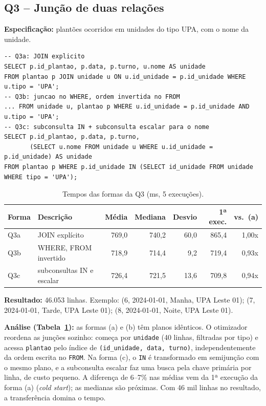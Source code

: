 \documentclass[10pt,a4paper]{article}
\begin{document}
\subsection{Q3 -- Junção de duas relações}
\textbf{Especificação:} plantões ocorridos em unidades do tipo UPA, com o nome da unidade.

\begin{lstlisting}
-- Q3a: JOIN explicito
SELECT p.id_plantao, p.data, p.turno, u.nome AS unidade
FROM plantao p JOIN unidade u ON u.id_unidade = p.id_unidade WHERE u.tipo = 'UPA';
-- Q3b: juncao no WHERE, ordem invertida no FROM
... FROM unidade u, plantao p WHERE u.id_unidade = p.id_unidade AND u.tipo = 'UPA';
-- Q3c: subconsulta IN + subconsulta escalar para o nome
SELECT p.id_plantao, p.data, p.turno,
       (SELECT u.nome FROM unidade u WHERE u.id_unidade = p.id_unidade) AS unidade
FROM plantao p WHERE p.id_unidade IN (SELECT id_unidade FROM unidade WHERE tipo = 'UPA');
\end{lstlisting}

\begin{table}[H]\centering\footnotesize
\caption{Tempos das formas da Q3 (ms, 5 execuções).}\label{tab:q3}
\begin{tabular}{llrrrrr}\toprule
Forma & Descrição & Média & Mediana & Desvio & 1ª exec. & vs.\ (a) \\ \midrule
Q3a & JOIN explícito              & 769,0 & 740,2 & 60,0 & 865,4 & 1,00x \\
Q3b & WHERE, FROM invertido       & 718,9 & 714,4 &  9,2 & 719,4 & 0,93x \\
Q3c & subconsultas IN e escalar   & 726,4 & 721,5 & 13,6 & 709,8 & 0,94x \\ \bottomrule
\end{tabular}
\end{table}

\textbf{Resultado:} 46.053 linhas. Exemplo: (6, 2024-01-01, Manha, UPA Leste 01); (7, 2024-01-01, Tarde, UPA Leste 01); (8, 2024-01-01, Noite, UPA Leste 01).

\textbf{Análise (Tabela~\ref{tab:q3}):} as formas (a) e (b) têm planos idênticos. O otimizador reordena as junções sozinho: começa por \texttt{unidade} (40 linhas, filtradas por tipo) e acessa \texttt{plantao} pelo índice de \texttt{(id\_unidade, data, turno)}, independentemente da ordem escrita no \texttt{FROM}. Na forma (c), o \texttt{IN} é transformado em semijunção com o mesmo plano, e a subconsulta escalar faz uma busca pela chave primária por linha, de custo pequeno. A diferença de 6--7\% nas médias vem da 1ª execução da forma (a) (\emph{cold start}); as medianas são próximas. Com 46 mil linhas no resultado, a transferência domina o tempo.
\end{document}
